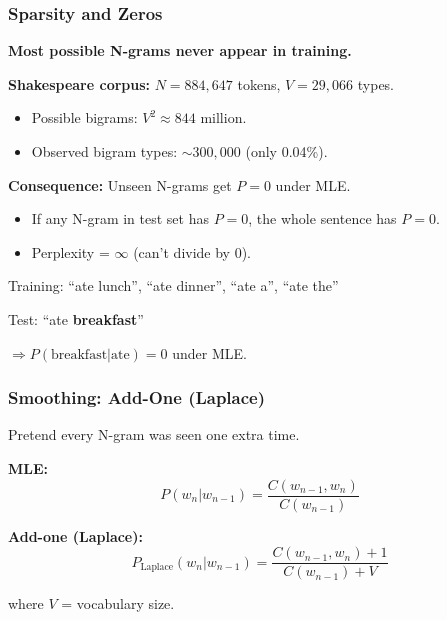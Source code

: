 \separator

\subsubsection{Sparsity and Zeros}

\begin{defbox}
\textbf{Most possible N-grams never appear in training.}

\textbf{Shakespeare corpus:} $N = 884{,}647$ tokens, $V = 29{,}066$ types.
\begin{itemize}
  \item Possible bigrams: $V^2 \approx 844$ million.
  \item Observed bigram types: $\sim 300{,}000$ (only 0.04\%).
\end{itemize}

\textbf{Consequence:} Unseen N-grams get $P = 0$ under MLE.
\end{defbox}

\begin{tipbox}
\begin{itemize}
  \item If any N-gram in test set has $P = 0$, the whole sentence has $P = 0$.
  \item Perplexity = $\infty$ (can't divide by 0).
\end{itemize}
\end{tipbox}

\begin{exbox}
Training: ``ate lunch'', ``ate dinner'', ``ate a'', ``ate the''

Test: ``ate \textbf{breakfast}''

$\Rightarrow P(\text{breakfast} | \text{ate}) = 0$ under MLE.
\end{exbox}

\bigseparator

\subsubsection{Smoothing: Add-One (Laplace)}

\begin{defbox}
Pretend every N-gram was seen one extra time.

\textbf{MLE:}
\[
P(w_n | w_{n-1}) = \frac{C(w_{n-1}, w_n)}{C(w_{n-1})}
\]

\textbf{Add-one (Laplace):}
\[
P_{\text{Laplace}}(w_n | w_{n-1}) = \frac{C(w_{n-1}, w_n) + 1}{C(w_{n-1}) + V}
\]

where $V$ = vocabulary size.
\end{defbox}

